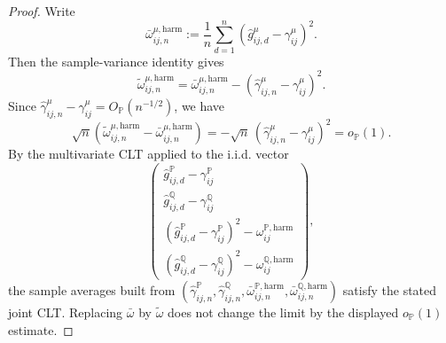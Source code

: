 \documentclass[11pt,a4paper]{amsart}
\theoremstyle{plain}
\theoremstyle{definition}
\theoremstyle{remark}
\newcommand{\PP}{\mathbb{P}}
\newcommand{\QQ}{\mathbb{Q}}
\begin{document}
\begin{proof}
Write
\[
        \bar\omega_{ij,n}^{\mu,\mathrm{harm}}
        :=
        \frac1n
        \sum_{d=1}^n
        \left(
                \widehat g_{ij,d}^\mu-\gamma_{ij}^\mu
        \right)^2.
\]
Then the sample-variance identity gives
\[
        \widetilde\omega_{ij,n}^{\mu,\mathrm{harm}}
        =
        \bar\omega_{ij,n}^{\mu,\mathrm{harm}}
        -
        (\widehat\gamma_{ij,n}^\mu-\gamma_{ij}^\mu)^2.
\]
Since \(\widehat\gamma_{ij,n}^\mu-\gamma_{ij}^\mu=O_\PP(n^{-1/2})\), we have
\[
        \sqrt{n}
        \left(
                \widetilde\omega_{ij,n}^{\mu,\mathrm{harm}}
                -
                \bar\omega_{ij,n}^{\mu,\mathrm{harm}}
        \right)
        =
        -\sqrt{n}\,(\widehat\gamma_{ij,n}^\mu-\gamma_{ij}^\mu)^2
        =
        o_\PP(1).
\]
By the multivariate CLT applied to the i.i.d. vector
\[
        \begin{pmatrix}
                \widehat g_{ij,d}^\PP-\gamma_{ij}^\PP\\
                \widehat g_{ij,d}^\QQ-\gamma_{ij}^\QQ\\
                (\widehat g_{ij,d}^\PP-\gamma_{ij}^\PP)^2-\omega_{ij}^{\PP,\mathrm{harm}}\\
                (\widehat g_{ij,d}^\QQ-\gamma_{ij}^\QQ)^2-\omega_{ij}^{\QQ,\mathrm{harm}}
        \end{pmatrix},
\]
the sample averages built from \((\widehat\gamma_{ij,n}^\PP,\widehat\gamma_{ij,n}^\QQ,
\bar\omega_{ij,n}^{\PP,\mathrm{harm}},\bar\omega_{ij,n}^{\QQ,\mathrm{harm}})\) satisfy the stated
joint CLT.  Replacing \(\bar\omega\) by \(\widetilde\omega\) does not change the limit by the
displayed \(o_\PP(1)\) estimate.
\end{proof}
\end{document}
